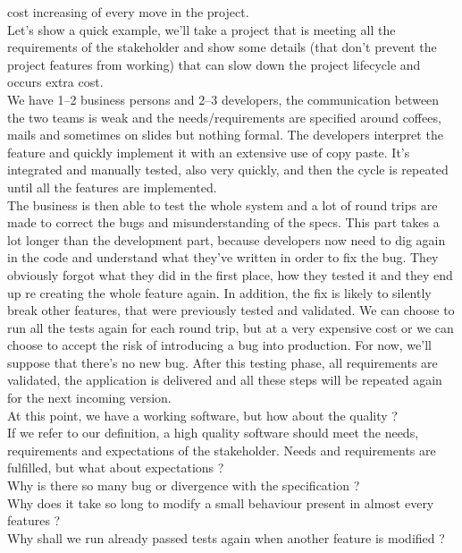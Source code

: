 cost increasing of every move in the project. \\
Let's show a quick example, we'll take a project that is meeting all the
requirements of the stakeholder and show some details (that don't prevent
the project features from working) that can slow down the project lifecycle
and occurs extra cost. \\
\newline
We have 1--2 business persons and 2--3 developers, the communication between
the two teams is weak and the needs/requirements are specified around
coffees, mails and sometimes on slides but nothing formal.
The developers interpret the feature and quickly implement it with an extensive
use of copy paste.
It's integrated and manually tested, also very quickly, and then the cycle
is repeated until all the features are implemented. \\
The business is then able to test the whole system and a lot of round trips
are made to correct the bugs and misunderstanding of the specs.
This part takes a lot longer than the development part, because developers
now need to dig again in the code and understand what they've written in
order to fix the bug.
They obviously forgot what they did in the first place, how they tested it
and they end up re creating the whole feature again.
In addition, the fix is likely to silently break other features, that were
previously tested and validated.
We can choose to run all the tests again for each round trip, but at a very
expensive cost or we can choose to accept the risk of introducing a bug into
production.
For now, we'll suppose that there's no new bug.
After this testing phase, all requirements are validated, the application is
delivered and all these steps will be repeated again for the next incoming
version. \\
\newline
At this point, we have a working software, but how about the quality ? \\
If we refer to our definition, a high quality software should meet the needs,
requirements and expectations of the stakeholder.
Needs and requirements are fulfilled, but what about expectations ? \\
Why is there so many bug or divergence with the specification ? \\
Why does it take so long to modify a small behaviour present in almost every
features ? \\
Why shall we run already passed tests again when another feature is modified
? \\

